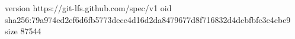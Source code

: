 version https://git-lfs.github.com/spec/v1
oid sha256:79a974ed2ef6d6fb5773dece4d16d2da8479677d8f716832d4dcbfbfc3c4cbe9
size 87544
